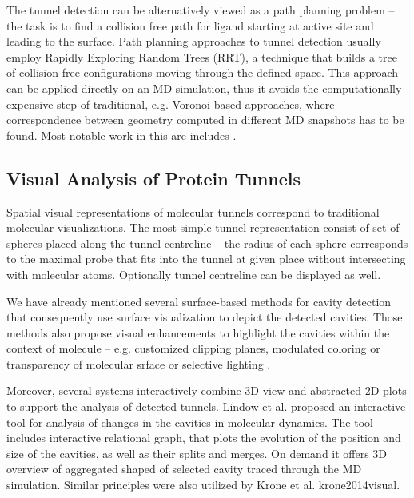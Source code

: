 The tunnel detection can be alternatively viewed as a path planning problem -- the task is to find a collision free path for ligand starting at active site and leading to the surface. Path planning approaches to tunnel detection usually employ Rapidly Exploring Random Trees \cite{lavalle1998rapidly} (RRT), a technique that builds a tree of collision free configurations moving through the defined space. This approach can be applied directly on an MD simulation, thus it avoids the computationally expensive step of traditional, e.g. Voronoi-based approaches, where correspondence between geometry computed in different MD snapshots has to be found. Most notable work in this are includes \cite{cortes2005path, vonasek2016application, vonasek2017tunnel}.

\subsection{Visual Analysis of Protein Tunnels}
Spatial visual representations of molecular tunnels correspond to traditional molecular visualizations. The most simple tunnel representation consist of set of spheres placed along the tunnel centreline -- the radius of each sphere corresponds to the maximal probe that fits into the tunnel at given place without intersecting with molecular atoms. Optionally tunnel centreline can be displayed as well. 

We have already mentioned several surface-based methods for cavity detection that consequently use surface visualization to depict the detected cavities. Those methods also propose visual enhancements to highlight the cavities within the context of molecule -- e.g. customized clipping planes, modulated coloring \cite{parulek2012implicit} or transparency of molecular srface \cite{jurvcik2016accelerated} or selective lighting \cite{Lindow2011Voronoi}. 

Moreover, several systems interactively combine 3D view and abstracted 2D plots to support the analysis of detected tunnels. Lindow et al. \cite{Lindow2012DynamicChannels, Lindow2013DynamicCavities} proposed an interactive tool for analysis of changes in the cavities in molecular dynamics. The tool includes interactive relational graph, that plots the evolution of the position and size of the cavities, as well as their splits and merges. On demand it offers 3D overview of aggregated shaped of selected cavity traced through the MD simulation. Similar principles were also utilized by Krone et al. {krone2014visual}.

